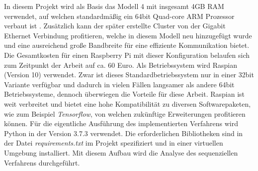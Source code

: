 In diesem Projekt wird als Basis das Modell 4 mit insgesamt 4GB \ac{RAM} verwendet, auf welchen standardmäßig ein 64bit Quad-core ARM Prozessor verbaut ist \cite{raspberryspecs}. Zusätzlich kann der später erstellte Cluster von der Gigabit Ethernet Verbindung profitieren, welche in diesem Modell neu hinzugefügt wurde und eine ausreichend große Bandbreite für eine effiziente Kommunikation bietet. Die Gesamtkosten für einen Raspberry Pi mit dieser Konfiguration belaufen sich zum Zeitpunkt der Arbeit auf ca. 60 Euro. Als Betriebssystem wird Raspian (Version 10) verwendet. Zwar ist dieses Standardbetriebssystem nur in einer 32bit Variante verfügbar und dadurch in vielen Fällen langsamer als andere 64bit Betriebssysteme, dennoch überwiegen die Vorteile für diese Arbeit. Raspian ist weit verbreitet und bietet eine hohe Kompatibilität zu diversen Softwarepaketen, wie zum Beispiel \emph{Tensorflow}, von welchen zukünftige Erweiterungen profitieren können. Für die eigentliche Ausführung des implementierten Verfahrens wird Python in der Version 3.7.3 verwendet. Die erforderlichen Bibliotheken sind in der Datei \emph{requirements.txt} im Projekt spezifiziert und in einer virtuellen Umgebung installiert. Mit diesem Aufbau wird die Analyse des sequenziellen Verfahrens durchgeführt.

